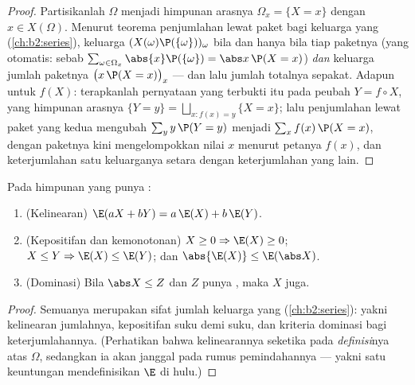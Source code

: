 \begin{proof}
Partisikanlah $\Omega$ menjadi himpunan arasnya $\Omega_x = \{X = x\}$ dengan $x
\in X(\Omega)$. Menurut teorema penjumlahan lewat paket bagi keluarga
yang  (\cref{ch:b2:series}), keluarga
$(X(\omega)\P(\{\omega\}))_\omega$  bila dan hanya bila tiap paketnya
 (yang otomatis: sebab $\sum_{\omega \in \Omega_x}\abs{x}\P(\{\omega\}) =
\abs x\,\P(X = x)$) \emph{dan} keluarga jumlah paketnya
$\bigl(x\,\P(X = x)\bigr)_x$  --- dan lalu jumlah
totalnya sepakat. Adapun untuk $f(X)$: terapkanlah pernyataan yang terbukti itu pada peubah $Y =
f \circ X$, yang himpunan arasnya $\{Y = y\} =
\bigsqcup_{x : f(x) = y}\{X = x\}$; lalu penjumlahan lewat paket yang
kedua mengubah $\sum_y y\,\P(Y = y)$ menjadi $\sum_x
f(x)\,\P(X = x)$, dengan paketnya kini mengelompokkan nilai $x$
menurut petanya $f(x)$, dan keterjumlahan  satu
keluarganya setara dengan keterjumlahan yang lain.
\end{proof}

\begin{theorem}\label{thm:b2:randomvar:linearity}
Pada himpunan  yang punya :
\begin{enumerate}
\item (Kelinearan) $\E(aX + bY) = a\,\E(X) + b\,\E(Y)$.
\item (Kepositifan dan kemonotonan) $X \geq 0 \Rightarrow \E(X)
\geq 0$; $X \leq Y \Rightarrow \E(X) \leq \E(Y)$; dan
$\abs{\E(X)} \leq \E(\abs X)$.
\item (Dominasi) Bila $\abs X \leq Z$ dan $Z$ punya ,
maka $X$ juga.
\end{enumerate}
\end{theorem}

\begin{proof}
Semuanya merupakan sifat jumlah keluarga yang 
(\cref{ch:b2:series}): yakni kelinearan jumlahnya, kepositifan suku demi
suku, dan kriteria dominasi bagi keterjumlahannya. (Perhatikan bahwa
kelinearannya seketika pada \emph{definisi}nya atas $\Omega$,
sedangkan ia akan janggal pada rumus pemindahannya --- yakni satu keuntungan
mendefinisikan $\E$ di hulu.)
\end{proof}

